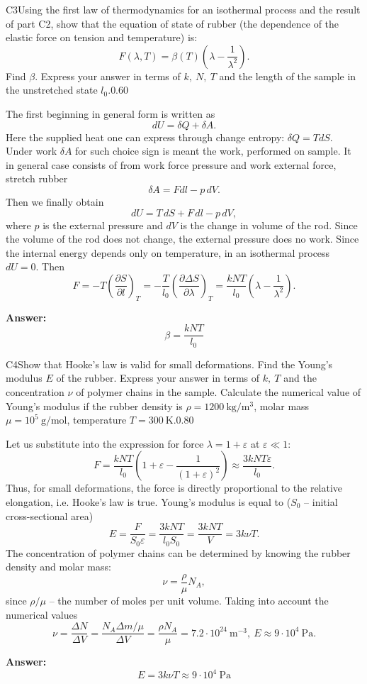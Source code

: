 \documentclass[11pt,a4paper]{article}
\begin{document}
\begin{solcard}{C3}{Using the first law of thermodynamics for an isothermal process and the result of part C2, show that the equation of state of rubber (the dependence of the elastic force on tension and temperature) is: \[ F(\lambda,T) = \beta(T) \left(\lambda-\dfrac{1}{\lambda^2}\right).\] Find $\beta$. Express your answer in terms of $k,~N,~T$ and the length of the sample in the unstretched state $l_0$.}{0.60}

The first beginning in general form is written as $$ dU = \delta Q + \delta A. $$Here the supplied heat one can express through change entropy: $\delta Q = T dS$. Under work $\delta A$ for such choice sign is meant the work, performed on sample. It in general case consists of from work force pressure and work external  force, stretch rubber $$ \delta A = Fdl - p\,dV. $$ Then we finally obtain $$dU = T\,dS + F\,dl - p\,dV,$$ where $p$ is the external pressure and $dV$ is the change in volume of the rod. Since the volume of the rod does not change, the external pressure does no work. Since the internal energy depends only on temperature, in an isothermal process $dU = 0$. Then \[ F = -T\left(\dfrac{\partial S}{\partial l}\right)_T = -\dfrac{T}{l_0}\left(\dfrac{\partial \Delta S}{\partial \lambda}\right)_T =\dfrac{kNT}{l_0}\left(\lambda - \dfrac{1}{\lambda^2}\right).\]

\par\smallskip\noindent\textbf{Answer:} \[\beta = \dfrac{kNT}{l_0}\]
\end{solcard}

\begin{solcard}{C4}{Show that Hooke's law is valid for small deformations. Find the Young's modulus $E$ of the rubber. Express your answer in terms of $k,~T$ and the concentration $\nu$ of polymer chains in the sample. Calculate the numerical value of Young's modulus if the rubber density is $\rho = 1200~\text{kg}/\text{m}^3$, molar mass $\mu = 10^5~\text{g}/\text{mol}$, temperature $T = 300~\text{K}$.}{0.80}

Let us substitute into the expression for force $\lambda = 1 + \varepsilon$ at $\varepsilon \ll 1$: \[F=\dfrac{kNT}{l_0}\left(1+\varepsilon - \dfrac{1}{(1+\varepsilon)^2}\right) \approx \dfrac{3kNT\varepsilon}{l_0}.\] Thus, for small deformations, the force is directly proportional to the relative elongation, i.e. Hooke's law is true. Young's modulus is equal to ($S_0$ – initial cross-sectional area) \[ E = \dfrac{F}{S_0\varepsilon} = \dfrac{3kNT}{l_0 S_0} = \dfrac{3kNT}{V} = 3k\nu T.\]The concentration of polymer chains can be determined by knowing the rubber density and molar mass: $$ \nu = \frac{\rho}{\mu} N_A, $$since $\rho/\mu$ – the number of moles per unit volume. Taking into account the numerical values \[\nu = \dfrac{\Delta N}{\Delta V} = \dfrac{N_A\Delta m /\mu}{\Delta V} = \dfrac{\rho N_A}{\mu} = 7.2\cdot10^{24}~\text{m}^{-3}, ~E \approx 9\cdot 10^4~\text{Pa}.\]

\par\smallskip\noindent\textbf{Answer:} \[E = 3k\nu T \approx 9\cdot 10^4~\text{Pa}\]
\end{solcard}
\end{document}

